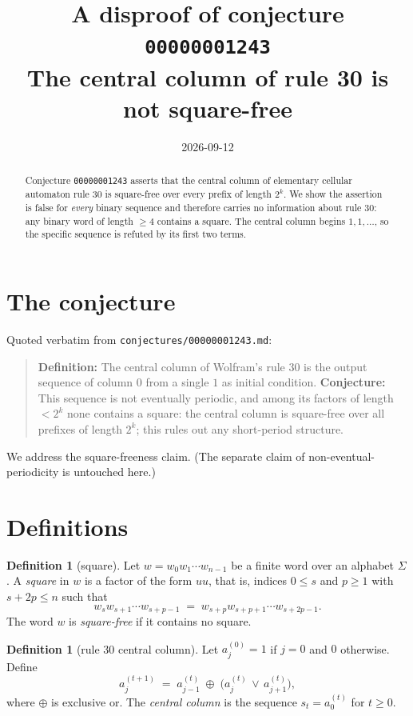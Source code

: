 \documentclass[11pt]{article}
\title{A disproof of conjecture \texttt{00000001243}\\
\large\upshape The central column of rule 30 is not square-free}
\author{}
\date{2026-09-12}
\theoremstyle{definition}
\newtheorem{definition}[theorem]{Definition}
\begin{document}
\maketitle

\begin{abstract}
Conjecture \texttt{00000001243} asserts that the central column of elementary
cellular automaton rule 30 is square-free over every prefix of length $2^k$.
We show the assertion is false for \emph{every} binary sequence and therefore
carries no information about rule 30: any binary word of length $\ge 4$
contains a square. The central column begins $1,1,\dots$, so the specific
sequence is refuted by its first two terms.
\end{abstract}

\section{The conjecture}

Quoted verbatim from \texttt{conjectures/00000001243.md}:

\begin{quote}
\textbf{Definition:} The central column of Wolfram's rule 30 is the output
sequence of column $0$ from a single $1$ as initial condition.
\textbf{Conjecture:} This sequence is not eventually periodic, and among its
factors of length $< 2^k$ none contains a square: the central column is
square-free over all prefixes of length $2^k$; this rules out any short-period
structure.
\end{quote}

We address the square-freeness claim. (The separate claim of
non-eventual-periodicity is untouched here.)

\section{Definitions}

\begin{definition}[square]
Let $w = w_0 w_1 \cdots w_{n-1}$ be a finite word over an alphabet $\Sigma$.
A \emph{square} in $w$ is a factor of the form $uu$, that is, indices
$0 \le s$ and $p \ge 1$ with $s + 2p \le n$ such that
\[
w_s w_{s+1} \cdots w_{s+p-1} \;=\; w_{s+p} w_{s+p+1} \cdots w_{s+2p-1}.
\]
The word $w$ is \emph{square-free} if it contains no square.
\end{definition}

\begin{definition}[rule 30 central column]
Let $a^{(0)}_j = 1$ if $j = 0$ and $0$ otherwise. Define
\[
a^{(t+1)}_j \;=\; a^{(t)}_{j-1} \;\oplus\; \bigl(a^{(t)}_j \,\lor\, a^{(t)}_{j+1}\bigr),
\]
where $\oplus$ is exclusive or. The \emph{central column} is the sequence
$s_t = a^{(t)}_0$ for $t \ge 0$.
\end{definition}
\end{document}
